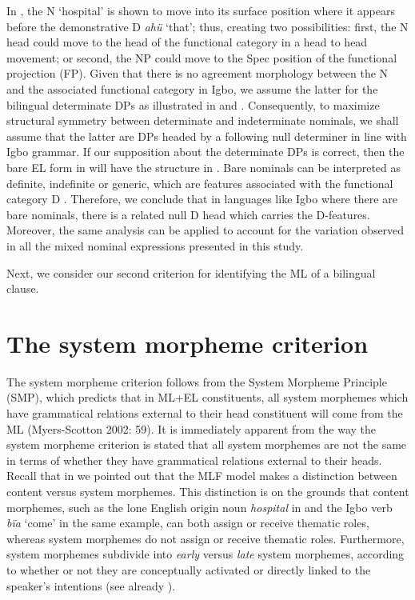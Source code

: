\documentclass[output=paper]{langsci/langscibook}
\begin{document}
In , the N ‘hospital’ is shown to move into its surface position where it appears before the demonstrative D \textit{ahü }‘that’; thus, creating two possibilities: first, the N head could move to the head of the functional category in a head to head movement; or second, the NP could move to the Spec position of the functional projection (FP). Given that there is no agreement morphology between the N and the associated functional category in Igbo, we assume the latter for the bilingual determinate DPs as illustrated in  and . Consequently, to maximize structural symmetry between determinate and indeterminate nominals, we shall assume that the latter are DPs headed by a following null determiner in line with Igbo grammar. If our supposition about the determinate DPs is correct, then the bare EL form in  will have the structure in . Bare nominals can be interpreted as definite, indefinite or generic, which are features associated with the functional category D \citep{Radford2004}. Therefore, we conclude that in languages like Igbo where there are bare nominals, there is a related null D head which carries the D-features. Moreover, the same analysis can be applied to account for the variation observed in all the mixed nominal expressions presented in this study. 

Next, we consider our second criterion for identifying the ML of a bilingual clause.

\section{The system morpheme criterion}

The system morpheme criterion follows from the System Morpheme Principle (SMP), which predicts that in ML+EL constituents, all system morphemes which have grammatical relations external to their head constituent will come from the ML (Myers-Scotton 2002: 59). It is immediately apparent from the way the system morpheme criterion is stated that all system morphemes are not the same in terms of whether they have grammatical relations external to their heads. Recall that in  we pointed out that the MLF model makes a distinction between content versus system morphemes. This distinction is on the grounds that content morphemes, such as the lone English origin noun \textit{hospital }in  and the Igbo verb \textit{bïa }‘come’ in the same example, can both assign or receive thematic roles, whereas system morphemes do not assign or receive thematic roles. Furthermore, system morphemes subdivide into \textit{early} versus \textit{late} system morphemes, according to whether or not they are conceptually activated or directly linked to the speaker’s intentions (see already ). 
\end{document}
